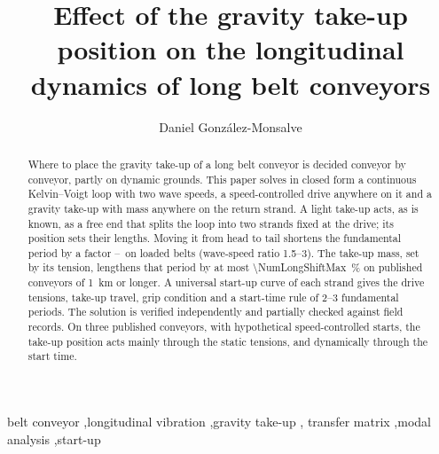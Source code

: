 \edef\next{\noexpand\documentclass[\paperlayout,a4paper]{elsarticle}}\next
\begin{document}
\begin{frontmatter}

\title{Effect of the gravity take-up position on the longitudinal dynamics of long
       belt conveyors}

\author{Daniel González-Monsalve}
\address{Department of Mechanical Engineering, Faculty of Engineering,
          Universidad de Concepción, Edmundo Larenas 219, Concepción, Chile}

\begin{abstract}
Where to place the gravity take-up of a long belt conveyor is decided conveyor by conveyor,
partly on dynamic grounds. This paper solves in closed form a continuous
Kelvin--Voigt loop with two wave speeds, a speed-controlled drive anywhere
on it and a gravity take-up with mass anywhere on the return strand. A light take-up acts, as is known, as a free end that splits the loop into two strands
fixed at the drive; its position sets their lengths. Moving it from head to tail shortens the
fundamental period by a factor \NumHeadTailRatioGammaThree--\NumHeadTailRatioGammaOneFive\ on
loaded belts (wave-speed ratio 1.5--3). The take-up mass, set by its tension, lengthens that period by at most
\qty{\NumLongShiftMax}{\percent} on published conveyors of \qty{1}{\kilo\metre} or longer. A universal start-up curve of each strand gives the drive
tensions, take-up travel, grip condition and a start-time rule of 2--3 fundamental periods. The
solution is verified independently and partially checked against field
records. On three published conveyors, with hypothetical speed-controlled starts, the take-up
position acts mainly through the static tensions, and dynamically through the start time.
\end{abstract}

\begin{keyword}
belt conveyor \sep longitudinal vibration \sep gravity take-up \sep
transfer matrix \sep modal analysis \sep start-up
\end{keyword}

\end{frontmatter}
\end{document}
